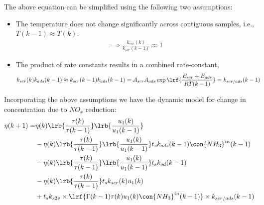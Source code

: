 The above equation can be simplified using the following two assumptions:
\begin{itemize}
        \item[$A1.$] The temperature does not change significantly across contiguous samples, i.e., $T(k-1) \approx T(k)$.
        \begin{align}
                \implies \frac{k_{scr}(k)}{k_{scr}(k-1)} \approx 1
        \end{align}
        \item[$A2.$] The product of rate constants results in a combined rate-constant,
        \begin{align}
                k_{scr}(k) k_{ads}(k-1) &\approx k_{scr}(k-1) k_{ads}(k-1)  = A_{scr}A_{ads} \exp\lrf{\frac{E_{scr}+E_{ads}}{R T(k-1)}} = k_{scr/ads}(k-1)
        \end{align}
\end{itemize}
Incorporating the above assumptions we have the dynamic model for change in concentration due to $NO_x$ reduction:
\begin{align*}
         \eta(k+1) =& \eta(k) \lrb{\frac{\tau(k)}{\tau(k-1)}}
                                \lrb{\frac{u_1(k)}{u_1(k-1)}}
                \\
                &-\eta(k) \lrb{\frac{\tau(k)}{\tau(k-1)}}
                                \lrb{\frac{u_1(k)}{u_1(k-1)}}
                t_s k_{ads}(k-1) \con{NH_3}^{in}(k-1)
                \\
                &-\eta(k) \lrb{\frac{\tau(k)}{\tau(k-1)}}
                                \lrb{\frac{u_1(k)}{u_1(k-1)}}
                t_s k_{od}(k-1)
                \\
                &-\eta(k) \lrb{\frac{\tau(k)}{\tau(k-1)}}
                t_s k_{scr}(k) u_1(k)
                \\
                &+ t_s k_{s2v} \times \lrf{\Gamma(k-1) \tau(k) u_1(k)\con{NH_3}^{in}(k-1)} \times k_{scr/ads}(k-1)
\end{align*}
\begin{equation}
       \label{eqn::nox_govern}
\end{equation}
